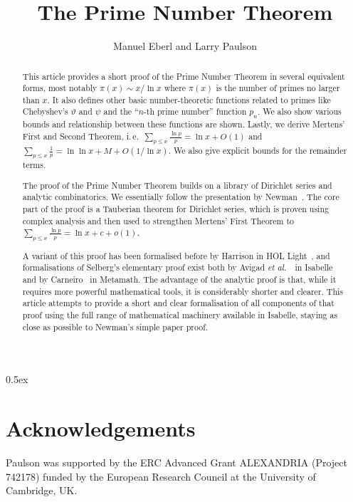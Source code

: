\documentclass[11pt,a4paper]{article}
\begin{document}
\title{The Prime Number Theorem}
\author{Manuel Eberl and Larry Paulson}
\maketitle

\begin{abstract}
This article provides a short proof of the Prime Number Theorem in several equivalent forms, most notably $\pi(x)\sim x / \ln x$ where $\pi(x)$ is the number of primes no larger than $x$. It also defines other basic number-theoretic functions related to primes like Chebyshev's $\vartheta$ and $\psi$ and the ``$n$-th prime number'' function $p_n$. We also show various bounds and relationship between these functions are shown. Lastly, we derive Mertens' First and Second Theorem, i.\,e.\ $\sum_{p\leq x} \frac{\ln p}{p} = \ln x + O(1)$ and $\sum_{p\leq x} \frac{1}{p} = \ln\ln x + M + O(1/\ln x)$. We also give explicit bounds for the remainder terms.

The proof of the Prime Number Theorem builds on a library of Dirichlet series and analytic combinatorics. We essentially follow the presentation by Newman~\cite{newman1998analytic}. The core part of the proof is a Tauberian theorem for Dirichlet series, which is proven using complex analysis and then used to strengthen Mertens' First Theorem to $\sum_{p\leq x} \frac{\ln p}{p} = \ln x + c + o(1)$.

A variant of this proof has been formalised before by Harrison in HOL Light~\cite{harrison-pnt}, and formalisations of Selberg's elementary proof exist both by Avigad \textit{et al.}\ \cite{avigad_pnt}\ in Isabelle and by Carneiro~\cite{carneiro_pnt} in Metamath.
The advantage of the analytic proof is that, while it requires more powerful mathematical tools, it is considerably shorter and clearer. This article attempts to provide a short and clear formalisation of all components of that proof using the full range of mathematical machinery available in Isabelle, staying as close as possible to Newman's simple paper proof.
\end{abstract}

\newpage
\tableofcontents
\newpage
\parindent 0pt\parskip 0.5ex



\section{Acknowledgements}
Paulson was supported by the ERC Advanced Grant ALEXANDRIA (Project 742178) funded by the European Research Council at the University of Cambridge, UK.



\end{document}
